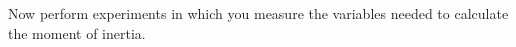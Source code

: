 \documentclass[11pt,letterpaper]{article}
\begin{document}

Now perform experiments in which you measure the variables needed to calculate the moment of inertia. %
\end{document}
